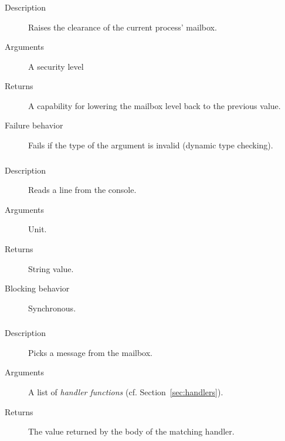 \subsubsection{}
\begin{description}
    \item [Description] Raises the clearance of the current process' mailbox. 
    \item [Arguments] A security level
    \item [Returns] A capability for lowering the mailbox level back to the previous value. 
    \item [Failure behavior] Fails if the type of the argument is invalid (dynamic type checking).
\end{description}




\subsubsection{}
\begin{description}
\item[Description] Reads a  line from the console.
\item[Arguments] Unit.
\item[Returns] String value.
\item[Blocking behavior] Synchronous.
\end{description}



\subsubsection{}
\begin{description}
    \item [Description] Picks a message from the mailbox.
    \item [Arguments] A list of \emph{handler functions} (cf. Section~\ref{sec:handlers}).
    \item [Returns] The value returned by the body of the matching handler.
\end{description}

